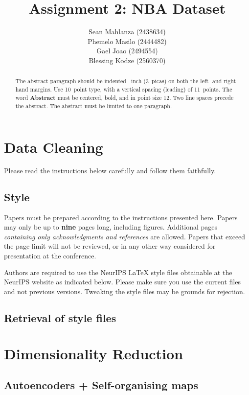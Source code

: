 \documentclass{article}
\title{Assignment 2: NBA Dataset}
\author{%
 Sean Mahlanza (2438634) \\ 
 Phemelo Masilo (2444482) \\
 Gael Joao (2494554) \\
 Blessing Kodze (2560370) \\
}
\begin{document}
\maketitle

\begin{abstract}
  The abstract paragraph should be indented ~inch (3~picas) on
  both the left- and right-hand margins. Use 10~point type, with a vertical
  spacing (leading) of 11~points.  The word \textbf{Abstract} must be centered,
  bold, and in point size 12. Two line spaces precede the abstract. The abstract
  must be limited to one paragraph.
\end{abstract}

\section{Data Cleaning}

Please read the instructions below carefully and follow them faithfully.

\subsection{Style}

Papers must be prepared according to the
instructions presented here. Papers may only be up to {\bf nine} pages long,
including figures. Additional pages \emph{containing only acknowledgments and
references} are allowed. Papers that exceed the page limit will not be
reviewed, or in any other way considered for presentation at the conference.

Authors are required to use the NeurIPS \LaTeX{} style files obtainable at the
NeurIPS website as indicated below. Please make sure you use the current files
and not previous versions. Tweaking the style files may be grounds for
rejection.

\subsection{Retrieval of style files}

\section{Dimensionality Reduction}

\subsection{Autoencoders + Self-organising maps}
\end{document}
